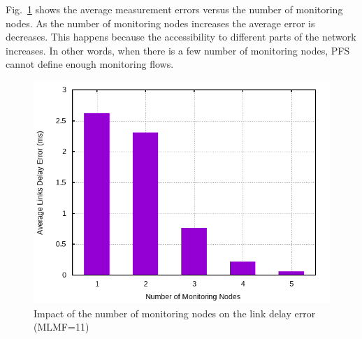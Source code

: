 \documentclass[10pt, journal, letterpaper]{IEEEtran}
\begin{document}
Fig.~\ref{fig:eval_summation_of_all_links_delay_and_percent_error_bar_chart} shows the average measurement errors versus the number of monitoring nodes. As the number of monitoring nodes increases the average error is decreases. This happens because the accessibility to different parts of the network increases. In other words, when there is a few number of monitoring nodes, PFS cannot define enough monitoring flows. 
\begin{figure}
    \centering
    \includegraphics[width=.9\columnwidth]{img/eval_summation_of_all_links_delay_and_percent_error_bar_chart.png}
    \caption{Impact of the number of monitoring nodes on the link delay error (MLMF=11)}
    \label{fig:eval_summation_of_all_links_delay_and_percent_error_bar_chart}
\end{figure}
\end{document}
